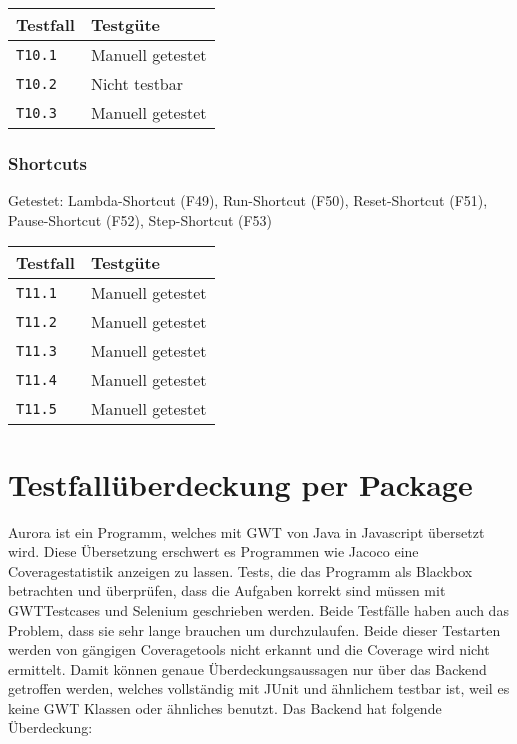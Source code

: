 \documentclass[parskip=full,11pt,twoside]{scrartcl}
\newcommand{\testline}[2]{
    \texttt{#1} & 
    \ifthenelse{\equal{#2}{Nicht getestet}}
        {\cellcolor{red!20}}
        {}
    \ifthenelse{\equal{#2}{Manuell getestet}}
        {\cellcolor{LimeGreen!20}}
        {}
    \ifthenelse{\equal{#2}{Automatisiert getestet}}
        {\cellcolor{green!20}}
        {}
    \ifthenelse{\equal{#2}{Nicht testbar}}
    {\cellcolor{gray!20}}
     {}
    #2 \\ \hline
}
\begin{document}
    \label{shortcuts}
    \begin{center}
        \begin{tabular}{ p{9cm} p{4cm}}
            Testfall & Testgüte \\ \hline
            \testline{T10.1}{Manuell getestet}
            \testline{T10.2}{Nicht testbar}
            \testline{T10.3}{Manuell getestet}
        \end{tabular}
    \end{center}

\subsubsection{Shortcuts}
    Getestet:
    Lambda-Shortcut (F49),
    Run-Shortcut (F50),
    Reset-Shortcut (F51),
    Pause-Shortcut (F52),
    Step-Shortcut (F53)

    \label{shortcuts}
    \begin{center}
        \begin{tabular}{ p{9cm} p{4cm}}
            Testfall & Testgüte \\ \hline
            \testline{T11.1}{Manuell getestet}
            \testline{T11.2}{Manuell getestet}
            \testline{T11.3}{Manuell getestet}
            \testline{T11.4}{Manuell getestet}
            \testline{T11.5}{Manuell getestet}
        \end{tabular}
    \end{center}

\section{Testfallüberdeckung per Package}
    Aurora ist ein Programm, welches mit GWT von Java in Javascript übersetzt wird.
    Diese Übersetzung erschwert es Programmen wie Jacoco eine Coveragestatistik anzeigen zu lassen.
    Tests, die das Programm als Blackbox betrachten und überprüfen, dass die Aufgaben korrekt sind müssen
    mit GWTTestcases und Selenium geschrieben werden.
    Beide Testfälle haben auch das Problem, dass sie sehr lange brauchen um durchzulaufen.
    Beide dieser Testarten werden von gängigen Coveragetools nicht erkannt und die Coverage wird nicht
    ermittelt.
    Damit können genaue Überdeckungsaussagen nur über das Backend getroffen werden, welches vollständig mit JUnit und ähnlichem
    testbar ist, weil es keine GWT Klassen oder ähnliches benutzt.
	Das Backend hat folgende Überdeckung:
	
\end{document}

